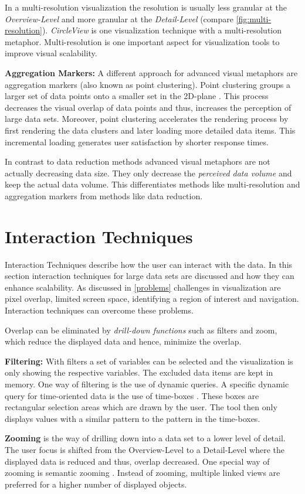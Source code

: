  In a multi-resolution visualization the resolution is usually less granular at the \textit{Overview-Level} and more granular at the \textit{Detail-Level} (compare \ref{fig:multi-resolution}). \textit{CircleView} is one visualization technique with a multi-resolution metaphor. Multi-resolution is one important aspect for visualization tools to improve visual scalability.\par
\textbf{Aggregation Markers:}\label{aggregationmarkers} A different approach for advanced visual metaphors are aggregation markers (also known as point clustering). Point clustering groups a larger set of data points onto a smaller set in the 2D-plane  \cite{Morrison2014}. This process decreases the visual overlap of data points and thus, increases the perception of large data sets. Moreover, point clustering accelerates the rendering process by first rendering the data clusters  and later loading more detailed data items. This incremental loading generates user satisfaction by shorter response times.\par
In contrast to data reduction methods advanced visual metaphors are not actually decreasing data size. They only decrease the \textit{perceived data volume} and keep the actual data volume. This differentiates methods like multi-resolution and aggregation markers from methods like data reduction. 


\section{Interaction Techniques}
Interaction Techniques describe how the user can interact with the data. In this section interaction techniques for large data sets are discussed and how they can enhance scalability. As discussed in \ref{problems} challenges in visualization are pixel overlap, limited screen space, identifying a region of interest and navigation. Interaction techniques can overcome these problems. 
\par
Overlap can be eliminated by \textit{drill-down functions} such as filters and zoom, which reduce the displayed data and hence, minimize the overlap. \par
\textbf{Filtering:} With filters a set of variables can be selected and the visualization is only showing the respective variables. The excluded data items are kept in memory.
One way of filtering is the use of dynamic queries. A specific dynamic query for time-oriented data is the use of time-boxes \cite{Hochheiser2004}. These boxes are rectangular selection areas which are drawn by the user. The tool then only displays values with a similar pattern to the pattern in the time-boxes.\par
\textbf{Zooming} is the way of drilling down into a data set to a lower level of detail. The user focus is shifted from the Overview-Level to a Detail-Level where the displayed data is reduced and thus, overlap decreased. One special way of zooming is semantic zooming  \cite{Boulos2003}. Instead of zooming, multiple linked views are preferred for a higher number of displayed objects.
\par

